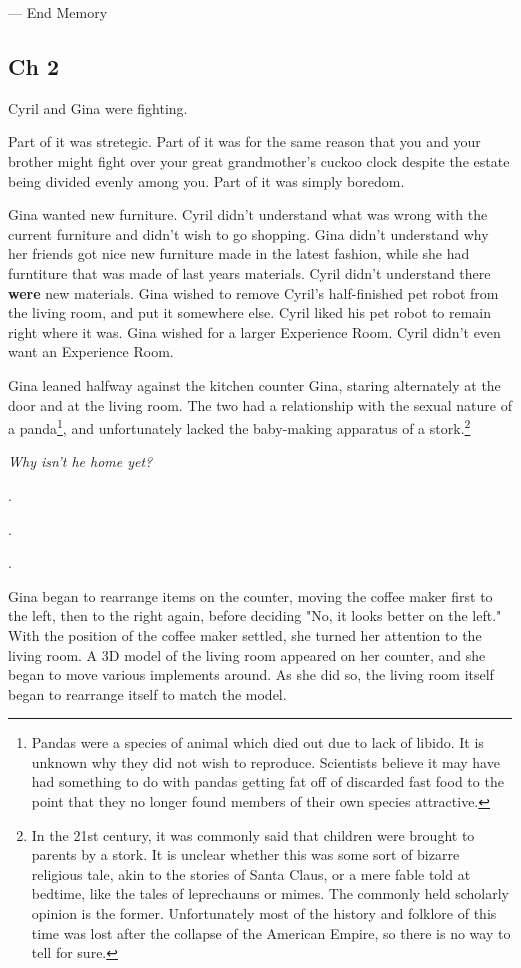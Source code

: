 \documentclass[12pt]{article}
\begin{document}
--- End Memory
\subsection*{Ch 2}
\label{sec:org0ed1d7c}

Cyril and Gina were fighting. 

Part of it was stretegic. Part of it was for the same reason that you and your brother might fight over your great grandmother's cuckoo clock despite the estate being divided evenly among you. Part of it was simply boredom.

Gina wanted new furniture. Cyril didn't understand what was wrong with the current furniture and didn't wish to go shopping. Gina didn't understand why her friends got nice new furniture made in the latest fashion, while she had furntiture that was made of last years materials. Cyril didn't understand there \textbf{were} new materials. Gina wished to remove Cyril's half-finished pet robot from the living room, and put it somewhere else. Cyril liked his pet robot to remain right where it was. Gina wished for a larger Experience Room. Cyril didn't even want an Experience Room.

Gina leaned halfway against the kitchen counter Gina, staring alternately at the door and at the living room. The two had a relationship with the sexual nature of a panda\footnote{Pandas were a species of animal which died out due to lack of libido. It is unknown why they did not wish to reproduce. Scientists believe it may have had something to do with pandas getting fat off of discarded fast food to the point that they no longer found members of their own species attractive.}, and unfortunately lacked the baby-making apparatus of a stork.\footnote{In the 21st century, it was commonly said that children were brought to parents by a stork. It is unclear whether this was some sort of bizarre religious tale, akin to the stories of Santa Claus, or a mere fable told at bedtime, like the tales of leprechauns or mimes. The commonly held scholarly opinion is the former. Unfortunately most of the history and folklore of this time was lost after the collapse of the American Empire, so there is no way to tell for sure.}

\emph{Why isn't he home yet?}

.

.

.

Gina began to rearrange items on the counter, moving the coffee maker first to the left, then to the right again, before deciding "No, it looks better on the left." With the position of the coffee maker settled, she turned her attention to the living room. A 3D model of the living room appeared on her counter, and she began to move various implements around. As she did so, the living room itself began to rearrange itself to match the model.
\end{document}

